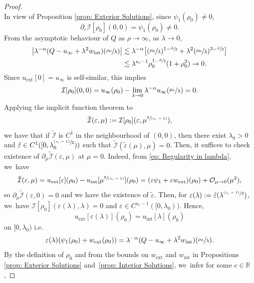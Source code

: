 \documentclass[10pt]{article}
\newcommand{\ie}{i.e.}
\newcommand{\psfrac}[2]{\sfrac{(#1)}{#2}}
\newcommand{\spfrac}[2]{\sfrac{#1}{(#2)}}
\theoremstyle{plain}
\theoremstyle{definition}
\DeclareMathOperator{\exterior}{ext}
\DeclareMathOperator{\interior}{int}
\begin{document}
\begin{proof}
\[\]
In view of Proposition \ref{prop: Exterior Solutions}, since $\psi_1(\rho_0)\neq 0$,
\[
\partial_\varepsilon \mathcal I[\rho_0](0,0)=\psi_1(\rho_0)\neq 0.
\]
From the asymptotic behaviour of $Q$ as $\rho\to\infty$, as $\lambda\to 0$,
\begin{equation}
\label{eq: Regularity in lambda}
\begin{aligned}
\big|\lambda^{-\alpha}(Q-u_\infty+\lambda^2 w_{\interior})(\sfrac{\rho_0}{\lambda})\big|
&\lesssim\lambda^{-\alpha}\big[(\sfrac{\rho_0}{\lambda})^{1-\sfrac{d}{2}}+\lambda^2(\sfrac{\rho_0}{\lambda})^{3-\sfrac{d}{2}}\big]\\
&\lesssim \lambda^{s_c-1}\rho_0^{1-\sfrac{d}{2}}(1+\rho_0^2)\to 0.
\end{aligned}
\end{equation}
Since $u_{\exterior}[0]=u_\infty$ is self-similar, this implies
\[
\mathcal I[\rho_0](0,0)=u_\infty (\rho_0)-\lim_{\lambda\to 0} \lambda^{-\alpha}u_\infty(\sfrac{\rho_0}{\lambda})=0.
\]
Applying the implicit function theorem to
\[
\tilde{\mathcal I}(\varepsilon, \mu):=\mathcal I[\rho_0](\varepsilon,\mu^{\spfrac{2}{s_c-1}}),
\]
we have that if $\tilde{\mathcal I}$ is $C^1$ in the neighbourhood of $(0,0)$, then there exist $\lambda_0>0$ and $\tilde \varepsilon \in C^1([0,\lambda_0^{\psfrac{s_c-1}{2}}))$ such that $\tilde{\mathcal I} (\tilde\varepsilon(\mu),\mu)=0$. Then, it suffices to check existence of $\partial _\mu \tilde{\mathcal I} (\varepsilon,\mu)$ at $\mu=0$. Indeed, from \eqref{eq: Regularity in lambda}, we~have
\[
\tilde{\mathcal I}(\varepsilon, \mu)=u_{\exterior}[\varepsilon](\rho_0)-u_{\interior}[\mu^{\spfrac{2}{s_c-1}}](\rho_0)=(\varepsilon \psi_1+\varepsilon w_{\exterior})(\rho_0)+\mathcal O_{\mu\to0}(\mu^2),
\]
so $\partial _\mu \tilde{\mathcal I} (\varepsilon,0)=0$ and we have the existence of $\tilde \varepsilon$. Then, for $\varepsilon(\lambda):=\tilde \varepsilon (\lambda^{\psfrac{s_c-1}{2}})$, we~have $\mathcal I[\rho_0](\varepsilon(\lambda),\lambda)=0$ and $\varepsilon\in C^{s_c-1}([0,\lambda_0))$. Hence,
\[
u_{\exterior}[\varepsilon(\lambda)](\rho_0)=u_{\interior}[\lambda](\rho_0)
\]
on $[0,\lambda_0)$ \ie
\begin{equation}
\label{eq: Matching}
\varepsilon(\lambda)(\psi_1(\rho_0)+w_{\exterior}(\rho_0))=\lambda^{-\alpha}(Q-u_\infty+\lambda^2w_{\interior})(\sfrac{\rho_0}{\lambda}).
\end{equation}
By the definition of $\rho_0$ and from the bounds on $w_{\exterior}$ and $w_{\interior}$ in Propositions \ref{prop: Exterior Solutions} and~\ref{prop: Interior Solutions}, we~infer for some $c\in \mathbb R$,

\end{proof}
\end{document}
